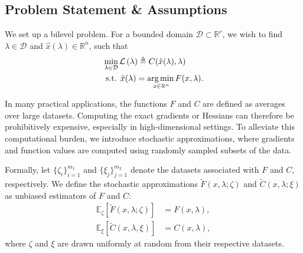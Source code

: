 \documentclass[11pt, twoside]{report}
\begin{document}
\subsection{Problem Statement \& Assumptions}
We set up a bilevel problem. For a bounded domain $\mathcal D \subset \mathbb{R}^r$, we wish to find $\lambda \in \mathcal{D}$ and $\hat{x}(\lambda) \in \mathbb{R}^n$, such that
\begin{align} 
&\min_{\lambda \in \mathcal{D}} \mathcal{L}\left(\lambda \right) \triangleq C(\hat{x}(\lambda), \lambda) \label{outer_hoag_neu}\\
&\text { s.t. } \hat{x}(\lambda) =\underset{x \in \mathbb{R}^{n}} {\operatorname*{arg\, min \,}} {F(x, \lambda)}. \label{inner_hoag_neu}
\end{align}

In many practical applications, the functions $F$ and $C$ are defined as averages over large datasets. 
Computing the exact gradients or Hessians can therefore be prohibitively expensive, especially in high-dimensional settings. 
To alleviate this computational burden, we introduce stochastic approximations, where gradients and function values are computed using randomly sampled subsets of the data. 

Formally, let $\{\zeta_i\}_{i=1}^{m_1}$ and $\{\xi_j\}_{j=1}^{m_2}$ denote the datasets associated with $F$ and $C$, respectively. 
We define the stochastic approximations $\tilde{F}(x, \lambda; \zeta)$ and $\tilde{C}(x, \lambda; \xi)$ as unbiased estimators of $F$ and $C$:
\begin{align*}
    \mathbb{E}_{\zeta}[\tilde{F}\left(x, \lambda ; \zeta\right)] &= F\left(x, \lambda\right), \\
    \mathbb{E}_{\xi}[\tilde{C}(x,\lambda,\xi)] &= C(x,\lambda),
\end{align*}
where $\zeta$ and $\xi$ are drawn uniformly at random from their respective datasets.
\end{document}
